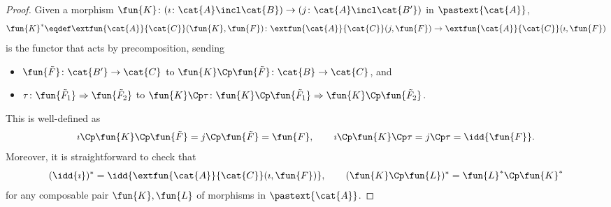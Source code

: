     \begin{proof}
        Given a morphism $\fun{K}\colon (\imath\colon \cat{A} \incl \cat{B}) \to (j\colon \cat{A} \incl \cat{B'})$ in $\pastext{\cat{A}}$,
\begin{equation*}
    \fun{K}^* \eqdef \extfun{\cat{A}}{\cat{C}}(\fun{K},\fun{F})\colon \extfun{\cat{A}}{\cat{C}}(j, \fun{F}) \to \extfun{\cat{A}}{\cat{C}}(\imath, \fun{F})
\end{equation*}
is the functor that acts by precomposition, sending
\begin{itemize}
    \item $\fun{\tilde{F}}\colon \cat{B'} \to \cat{C}$ to $\fun{K}\Cp\fun{\tilde{F}}\colon \cat{B} \to \cat{C}$, and
    \item $\tau\colon \fun{\tilde{F}_1} \Rightarrow \fun{\tilde{F}_2}$ to $\fun{K}\Cp\tau\colon \fun{K}\Cp\fun{\tilde{F}_1} \Rightarrow \fun{K}\Cp\fun{\tilde{F}_2}$.
\end{itemize}
This is well-defined as
\begin{equation*}
    \imath\Cp\fun{K}\Cp\fun{\tilde{F}} = j\Cp\fun{\tilde{F}} = \fun{F}, \quad \quad
    \imath\Cp\fun{K}\Cp\tau = j\Cp\tau = \idd{\fun{F}}.
\end{equation*}
Moreover, it is straightforward to check that
\begin{equation*}
    (\idd{\imath})^* = \idd{\extfun{\cat{A}}{\cat{C}}(\imath, \fun{F})}, \quad \quad 
    (\fun{K}\Cp\fun{L})^* = \fun{L}^*\Cp \fun{K}^*
\end{equation*}
for any composable pair $\fun{K}, \fun{L}$ of morphisms in $\pastext{\cat{A}}$.


\end{proof}
